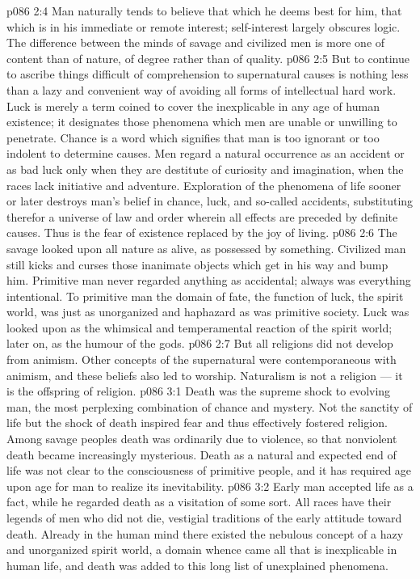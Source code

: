 \vs p086 2:4 \pc Man naturally tends to believe that which he deems best for him, that which is in his immediate or remote interest; self\hyp{}interest largely obscures logic. The difference between the minds of savage and civilized men is more one of content than of nature, of degree rather than of quality.
\vs p086 2:5 But to continue to ascribe things difficult of comprehension to supernatural causes is nothing less than a lazy and convenient way of avoiding all forms of intellectual hard work. Luck is merely a term coined to cover the inexplicable in any age of human existence; it designates those phenomena which men are unable or unwilling to penetrate. Chance is a word which signifies that man is too ignorant or too indolent to determine causes. Men regard a natural occurrence as an accident or as bad luck only when they are destitute of curiosity and imagination, when the races lack initiative and adventure. Exploration of the phenomena of life sooner or later destroys man’s belief in chance, luck, and so\hyp{}called accidents, substituting therefor a universe of law and order wherein all effects are preceded by definite causes. Thus is the fear of existence replaced by the joy of living.
\vs p086 2:6 The savage looked upon all nature as alive, as possessed by something. Civilized man still kicks and curses those inanimate objects which get in his way and bump him. Primitive man never regarded anything as accidental; always was everything intentional. To primitive man the domain of fate, the function of luck, the spirit world, was just as unorganized and haphazard as was primitive society. Luck was looked upon as the whimsical and temperamental reaction of the spirit world; later on, as the humour of the gods.
\vs p086 2:7 But all religions did not develop from animism. Other concepts of the supernatural were contemporaneous with animism, and these beliefs also led to worship. Naturalism is not a religion --- it is the offspring of religion.
\vs p086 3:1 Death was the supreme shock to evolving man, the most perplexing combination of chance and mystery. Not the sanctity of life but the shock of death inspired fear and thus effectively fostered religion. Among savage peoples death was ordinarily due to violence, so that nonviolent death became increasingly mysterious. Death as a natural and expected end of life was not clear to the consciousness of primitive people, and it has required age upon age for man to realize its inevitability.
\vs p086 3:2 \pc Early man accepted life as a fact, while he regarded death as a visitation of some sort. All races have their legends of men who did not die, vestigial traditions of the early attitude toward death. Already in the human mind there existed the nebulous concept of a hazy and unorganized spirit world, a domain whence came all that is inexplicable in human life, and death was added to this long list of unexplained phenomena.
